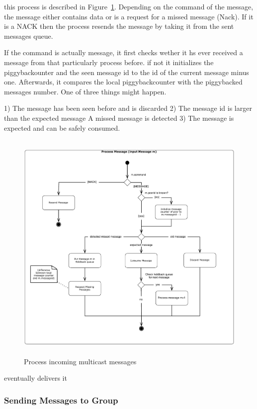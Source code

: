 this process is described in Figure~\ref{fig:figures_processMessages}.
Depending on the command of the message, the message either contains data or is a request for a missed message (Nack). If it is a NACK  then the process resends the message by taking it from the sent messages queue.


If the command is actually message, it first checks wether it hs ever received a message from that particularly process before. if not it initializes the piggybackounter and the seen message id to the id of the current message minus one. 
Afterwards, it compares the local piggybackcounter with the piggybacked messages number. One of three things might happen. 

1) The message has been seen before and is discarded
2) The message id is larger than the expected message
    A missed message is detected
3) The message is expected and can be safely consumed.


 
\begin{figure}[htbp]
    \centering
        \includegraphics[height=4.5in]{figures/processMessages.pdf}
    \caption{Process incoming multicast messages}
    \label{fig:figures_processMessages}
\end{figure}

eventually delivers it


\subsubsection{Sending Messages to Group}

